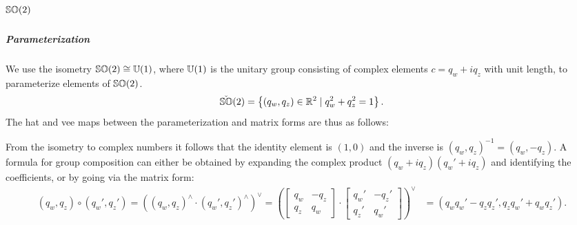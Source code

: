 
\chapter{${\mathbb{SO}(2)}$}

\paragraph{Parameterization} We use the isometry ${\mathbb{SO}(2)} \cong {\mathbb{U}(1)}$, where ${\mathbb{U}(1)}$ is the unitary group consisting of complex elements $c = q_{w} + i q_{z}$ with unit length, to parameterize elements of ${\mathbb{SO}(2)}$.
\begin{equation}
  \check{\mathbb{SO}}(2) = \left\{ (q_w, q_z) \in \mathbb{R}^{2} \mid q_w^2 + q_z^2 = 1 \right\}.
\end{equation}
The hat and vee maps between the parameterization and matrix forms are thus as follows:
\begin{center}
\end{center}

From the isometry to complex numbers it follows that the identity element is $(1, 0)$ and the inverse is
$(q_w, q_z)^{-1} = (q_w, -q_z)$. A formula for group composition can either be obtained by expanding the complex product $(q_{w} + i q_{z}) (q_{w}' + i q_{z})$ and identifying the coefficients, or by going via the matrix form:
\begin{equation*}
  \begin{aligned}
    (q_w, q_z) \circ (q_w', q_z') = \left( (q_w, q_z)^\wedge \cdot (q_w', q_z')^\wedge \right)^\vee = \left( \begin{bmatrix}
      q_w & -q_z \\ q_z & q_w
    \end{bmatrix} \cdot \begin{bmatrix}
      q_w' & -q_z' \\ q_z' & q_w'
    \end{bmatrix}  \right)^\vee & = (q_w q_w' - q_z q_z', q_z q_w' + q_w q_z').
  \end{aligned}
\end{equation*}

